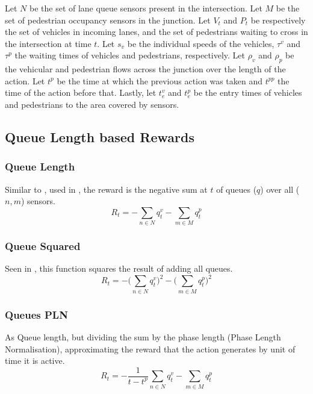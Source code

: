\documentclass[sigconf,anonymous]{aamas}
\begin{document}
Let $N$ be the set of lane queue sensors present in the intersection.
Let $M$ be the set of pedestrian occupancy sensors in the junction.
Let $V_t$ and $P_t$ be respectively the set of vehicles in incoming lanes, and the set of pedestrians waiting to cross in the intersection at time $t$. 
Let $s_v$ be the individual speeds of the vehicles, $\tau^v$ and $\tau^p$ the waiting times of vehicles and pedestrians, respectively.
Let $\rho_v$ and $\rho_p$ be the vehicular and pedestrian flows across the junction over the length of the action.
Let $t^p$ be the time at which the previous action was taken and $t^{pp}$ the time of the action before that.
Lastly, let $t^v_e$ and $t^p_e$ be the entry times of vehicles and pedestrians to the area covered by sensors. 

\subsection{Queue Length based Rewards}
\subsubsection{Queue Length}
Similar to \cite{pra2010}, used in \cite{aslani2019}, the reward is the negative sum at $t$ of queues ($q$) over all ($n,m$) sensors.
\begin{equation}
    R_t = - \sum_{n \in N} q^v_{t} - \sum_{m \in M} q^p_{t}
\label{eq:queue}
\end{equation}

\subsubsection{Queue Squared}
Seen in \cite{gendersthesis}, this function squares the result of adding all queues.
\begin{equation}
   R_t = -  \bigg( \sum_{n \in N} q^v_{t} \bigg)^2 - \bigg( \sum_{m \in M} q^p_{t} \bigg)^2
\label{eq:queuesq} 
\end{equation}

\subsubsection{Queues PLN}
As Queue length, but dividing the sum by the phase length (Phase Length Normalisation), approximating the reward that the action generates by unit of time it is active.
\begin{equation}
    R_t = - \frac{1}{t-t^p}  \sum_{n \in N} q^v_{t} -  \sum_{m \in M} q^p_{t}
    \label{queuepln}
\end{equation}
\end{document}
